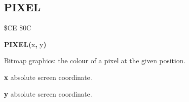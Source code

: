 
\newpage
\subsection{PIXEL}
\begin{description}[leftmargin=2cm,style=nextline]
\item [Token:] \$CE \$0C
\item [Format:] {\bf PIXEL(}x{\bf,} y{\bf)}
\item [Returns:] Bitmap graphics: the colour of a pixel at the given position.

               {\bf x} absolute screen coordinate.

               {\bf y} absolute screen coordinate.
\end{description}



\newpage
